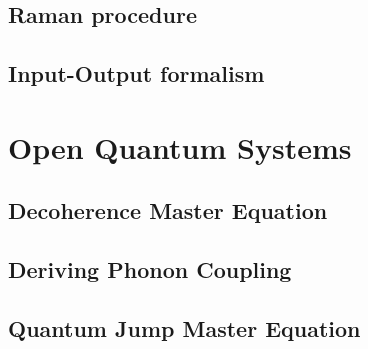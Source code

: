 \subsection{Raman procedure}

\subsection{Input-Output formalism}

\section{Open Quantum Systems}

\subsection{Decoherence Master Equation}

\subsection{Deriving Phonon Coupling}

\subsection{Quantum Jump Master Equation}


